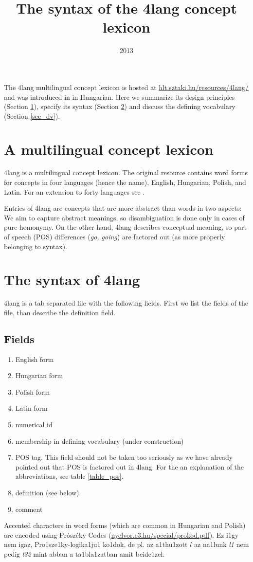 \documentclass[a4paper,10pt]{article}
\title{The syntax of the 4lang concept lexicon}
\date{2013}
\begin{document}
\maketitle
The 4lang multilingual concept lexicon is hosted at \url{hlt.sztaki.hu/resources/4lang/} and was introduced in \cite{Kornai:2013} in Hungarian. Here we summarize its design principles (Section \ref{sec_principles}), specify its syntax (Section \ref{sec_synt}) and discuss the defining vocabulary (Section \ref{sec_dv}).
\section{A multilingual concept lexicon}\label{sec_principles}
4lang is a multilingual concept lexicon. The original resource contains word forms for concepts in four languages (hence the name), English, Hungarian, Polish, and Latin. For an extension to forty languages see \cite{Acs:2013}.

Entries of 4lang are concepts that are more abstract than words in two
aspects: We aim to capture abstract meanings, so disambiguation is done only
in cases of pure homonymy. On the other hand, 4lang describes conceptual
meaning, so part of speech (POS) differences (\emph{go, going}) are factored
out (as more properly belonging to syntax).
\section{The syntax of 4lang}\label{sec_synt}
4lang is a tab separated file with the following fields. First we list the fields of the file, than describe the definition field.
\subsection{Fields}
\begin{enumerate}
 \item English form
\item Hungarian form
\item Polish form
\item Latin form
\item numerical id
\item membership in defining vocabulary (under construction)
\item POS tag. This field should not be taken too seriously as we have already pointed out that POS is factored out in 4lang. For the an explanation of the abbreviations, see table \ref{table_pos}.
\item definition (see below)
\item comment
\end{enumerate}
Accented characters in word forms (which are common in Hungarian and Polish)
are encoded using Prószéky Codes (\url{nyelvor.c3.hu/special/prokod.pdf}). 
{\color{red} Ez i1gy nem igaz, Pro1sze1ky-logika1ju1 ko1dok, de pl. az
  a1thu1zott $l$ az na1lunk {\it l1} nem pedig {\it l32} mint abban a 
ta1bla1zatban amit beide1zel.}
\end{document}
